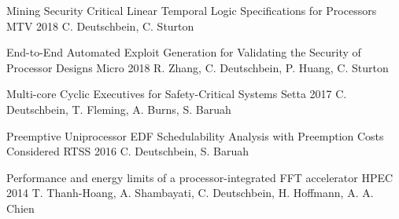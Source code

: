 
\begin{cventries}
  \cventry
    {}%
    {Mining Security Critical Linear Temporal Logic Specifications for Processors} %
    {MTV 2018} %
    {}
    {C. Deutschbein, C. Sturton}

  \cventry
    {}
    {End-to-End Automated Exploit Generation for Validating the Security of Processor Designs} %
    {Micro 2018} %
    {}
    {R. Zhang, C. Deutschbein, P. Huang, C. Sturton}

  \cventry
    {}
    {Multi-core Cyclic Executives for Safety-Critical Systems} %
    {Setta 2017} %
    {}
    {C. Deutschbein, T. Fleming, A. Burns, S. Baruah}

  \cventry
    {}
    {Preemptive Uniprocessor EDF Schedulability Analysis with Preemption Costs Considered} %
    {RTSS 2016} %
    {}
    {C. Deutschbein, S. Baruah}

  \cventry
    {}
    {Performance and energy limits of a processor-integrated FFT accelerator} %
    {HPEC 2014} %
    {}
    {T. Thanh-Hoang, A. Shambayati, C. Deutschbein, H. Hoffmann, A. A. Chien}

\end{cventries}

